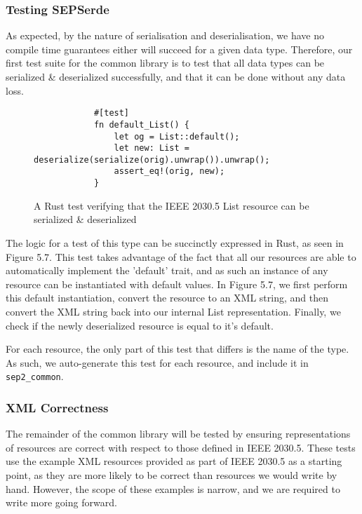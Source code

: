 \subsubsection{Testing SEPSerde}
As expected, by the nature of serialisation and deserialisation, we have no compile time guarantees either will succeed for a given data type.
Therefore, our first test suite for the common library is to test that all data types can be serialized \& deserialized successfully, and that it can be done without any data loss.

\begin{figure}[h]
    \begin{center}
        \begin{lstlisting}
            #[test]
            fn default_List() {
                let og = List::default();
                let new: List = deserialize(serialize(orig).unwrap()).unwrap();
                assert_eq!(orig, new);
            }
        \end{lstlisting}
        \label{fig:yaserdetest}
        \vspace{-10pt}
        \caption{A Rust test verifying that the IEEE 2030.5 List resource can be serialized \& deserialized}
    \end{center}
\end{figure}

The logic for a test of this type can be succinctly expressed in Rust, as seen in Figure 5.7. 
This test takes advantage of the fact that all our resources are able to automatically implement the 'default' trait, and as such an instance of any resource can be instantiated with default values.
In Figure 5.7, we first perform this default instantiation, convert the resource to an XML string, and then convert the XML string back into our internal List representation. 
Finally, we check if the newly deserialized resource is equal to it's default.

For each resource, the only part of this test that differs is the name of the type. As such, we auto-generate this test for each resource, and include it in \texttt{sep2\_common}.

\subsubsection{XML Correctness}
The remainder of the common library will be tested by ensuring representations of resources are correct with respect to those defined in IEEE 2030.5.
These tests use the example XML resources provided as part of IEEE 2030.5 as a starting point, as they are more likely to be correct than resources we would write by hand. However, the scope of these examples is narrow, and we are required to write more going forward.

